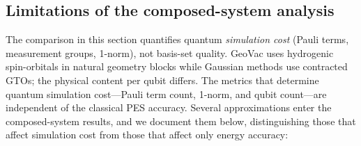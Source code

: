 \documentclass[aps,pra,twocolumn,superscriptaddress,longbibliography]{revtex4-2}
\begin{document}
\subsection{Limitations of the composed-system analysis}
\label{sec:composed_limitations}

The comparison in this section quantifies quantum \emph{simulation cost}
(Pauli terms, measurement groups, 1-norm), not basis-set quality.
GeoVac uses hydrogenic spin-orbitals in natural geometry blocks while
Gaussian methods use contracted GTOs; the physical content per qubit
differs.  The metrics that determine quantum simulation cost---Pauli
term count, 1-norm, and qubit count---are independent of the classical
PES accuracy.  Several approximations enter the composed-system
results, and we document them below, distinguishing those that affect
simulation cost from those that affect only energy accuracy:
\end{document}
